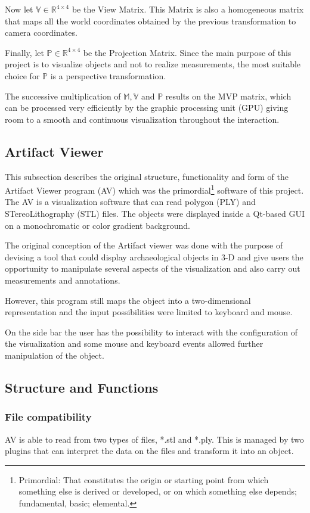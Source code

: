 \documentclass[12pt]{extarticle}
\newcommand{\R}{\mathbb{R}}
\newcommand{\Mod}{\mathbb{M}}
\newcommand{\Pro}{\mathbb{P}}
\newcommand{\Vie}{\mathbb{V}}
\begin{document}
Now let $\Vie\in \R ^{4\times 4}$ be the View Matrix. This Matrix is also a homogeneous matrix that maps all the world coordinates obtained by the previous transformation to camera coordinates.

Finally, let $\Pro\in \R ^{4\times 4}$ be the Projection Matrix. Since the main purpose of this project is to visualize objects and not to realize measurements, the most suitable choice for $\Pro$ is a perspective transformation.

The successive multiplication of $\Mod, \Vie$ and $\Pro$ results on the MVP matrix, which can be processed very efficiently by the graphic processing unit (GPU) giving room to a smooth and continuous visualization throughout the interaction.

\subsection{Artifact Viewer}
This subsection describes the original structure, functionality and form of the Artifact Viewer program (AV) which was the primordial\footnote{Primordial: That constitutes the origin or starting point from which something else is derived or developed, or on which something else depends; fundamental, basic; elemental.\cite{OED}} software of this project\cite{AV}. The AV is a visualization software that can read polygon (PLY) and STereoLithography (STL) files. The objects were displayed inside a Qt-based GUI on a monochromatic or color gradient background.

The original conception of the Artifact viewer was done with the purpose of devising a tool that could display archaeological objects in 3-D and give users the opportunity to manipulate several aspects of the visualization and also carry out measurements and annotations.

However, this program still maps the object into a two-dimensional representation and the input possibilities were limited to keyboard and mouse.

On the side bar the user has the possibility to interact with the configuration of the visualization and some mouse and keyboard events allowed further manipulation of the object.
\subsection {Structure and Functions}
	\subsubsection { File compatibility}
	AV is able to read from two types of files, *.stl and *.ply. This is managed by two plugins that can interpret the data on the files and transform it into an object.
\end{document}
